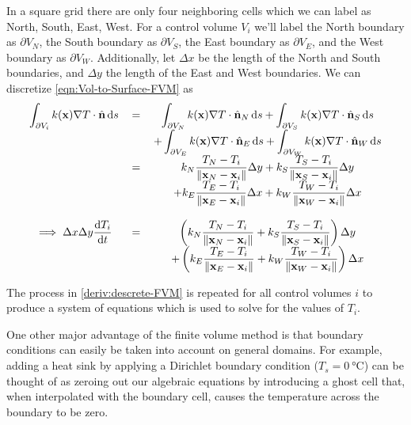 In a square grid there are only four neighboring cells which we can label as North, South, East, West. For a control volume $V_i$ we'll label the North boundary as $\partial V_N$, the South boundary as $\partial V_S$, the East boundary as $\partial V_E$, and the West boundary as $\partial V_W$. Additionally, let $\Delta x$ be the length of the North and South boundaries, and $\Delta y$ the length of the East and West boundaries. We can discretize \eqref{eqn:Vol-to-Surface-FVM} as
\begin{equation}
	\begin{tabular}{ccc}
		$\displaystyle\int_{\partial V_i}k(\mathbf{x})\nabla T\cdot\hat{\mathbf{n}}\dif s$ & $=$ & $\displaystyle\int_{\partial V_N}k(\mathbf{x})\nabla T\cdot\hat{\mathbf{n}}_N\dif s+\int_{\partial V_S}k(\mathbf{x})\nabla T\cdot\hat{\mathbf{n}}_S\dif s$\\
		 &  & $\displaystyle+\int_{\partial V_E}k(\mathbf{x})\nabla T\cdot\hat{\mathbf{n}}_E\dif s+\int_{\partial V_W}k(\mathbf{x})\nabla T\cdot\hat{\mathbf{n}}_W\dif s$\\
		 & $=$ & $\displaystyle k_N\frac{T_N-T_i}{\|\mathbf{x}_N-\mathbf{x}_i\|}\Delta y+k_S\frac{T_S-T_i}{\|\mathbf{x}_S-\mathbf{x}_i\|}\Delta y$\\
		 & & $\displaystyle+k_E\frac{T_E-T_i}{\|\mathbf{x}_E-\mathbf{x}_i\|}\Delta x+k_W\frac{T_W-T_i}{\|\mathbf{x}_W-\mathbf{x}_i\|}\Delta x$\\
		 & & \\
		 $\displaystyle\implies \Delta x\Delta y\frac{\dif T_i}{\dif t}$ & $=$ & $\displaystyle\left( k_N\frac{T_N-T_i}{\|\mathbf{x}_N-\mathbf{x}_i\|}+k_S\frac{T_S-T_i}{\|\mathbf{x}_S-\mathbf{x}_i\|}\right)\Delta y$\\
		 & & $\displaystyle+\left(k_E\frac{T_E-T_i}{\|\mathbf{x}_E-\mathbf{x}_i\|}+k_W\frac{T_W-T_i}{\|\mathbf{x}_W-\mathbf{x}_i\|}\right)\Delta x$
	\end{tabular}\label{deriv:descrete-FVM}
\end{equation}

The process in \eqref{deriv:descrete-FVM} is repeated for all control volumes $i$ to produce a system of equations which is used to solve for the values of $T_i$.

One other major advantage of the finite volume method is that boundary conditions can easily be taken into account on general domains. For example, adding a heat sink by applying a Dirichlet boundary condition ($T_s=\SI{0}{\degreeCelsius}$) can be thought of as zeroing out our algebraic equations by introducing a ghost cell that, when interpolated with the boundary cell, causes the temperature across the boundary to be zero.